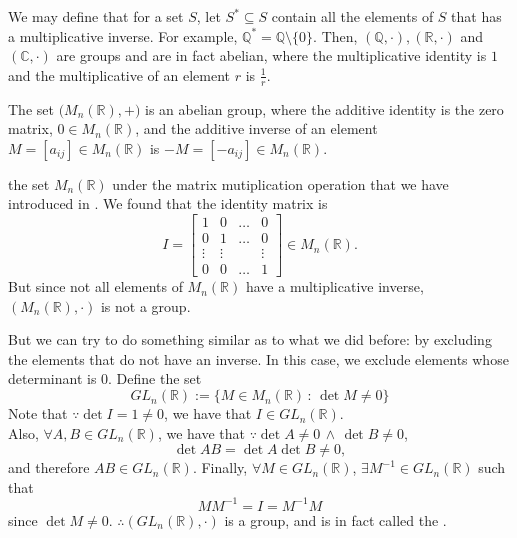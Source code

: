 \documentclass[notoc,notitlepage]{tufte-book}
\begin{document}
We may define that for a set $S$, let $S^* \subseteq S$ contain all the elements of $S$ that has a multiplicative inverse. For example, $\mathbb{Q}^* = \mathbb{Q} \setminus \{0\}$. Then, $(\mathbb{Q}, \cdot), (\mathbb{R}, \cdot)$ and $(\mathbb{C}, \cdot)$ are groups and are in fact abelian, where the multiplicative identity is $1$ and the multiplicative of an element $r$ is $\frac{1}{r}$.

\begin{eg}
  The set $\big( M_n(\mathbb{R}), + \big)$ is an abelian group, where the additive identity is the zero matrix, $0 \in M_n(\mathbb{R})$, and the additive inverse of an element $M = [a_{ij}] \in M_n(\mathbb{R})$ is $-M = [-a_{ij}] \in M_n(\mathbb{R})$.
\end{eg}

 the set $M_n(\mathbb{R})$ under the matrix mutiplication operation that we have introduced in . We found that the identity matrix is
\begin{equation*}
  I = \begin{bmatrix}
    1 & 0 & \hdots & 0 \\
    0 & 1 & \hdots & 0 \\
    \vdots & \vdots & & \vdots \\
    0 & 0 & \hdots & 1
  \end{bmatrix} \in M_n(\mathbb{R}).
\end{equation*}
But since not all elements of $M_n(\mathbb{R})$ have a multiplicative inverse, $(M_n(\mathbb{R}), \cdot)$ is not a group.

But we can try to do something similar as to what we did before: by excluding the elements that do not have an inverse. In this case, we exclude elements whose determinant is $0$. Define the set
\begin{equation*}
  GL_n(\mathbb{R}) := \{ M \in M_n(\mathbb{R}) \, : \, \det M \neq 0 \}
\end{equation*}
Note that $\because \det I = 1 \neq 0$, we have that $I \in GL_n(\mathbb{R})$. \\
Also, $\forall A, B \in GL_n(\mathbb{R} )$, we have that $\because \det A \neq 0 \, \land \, \det B \neq 0$,
\begin{equation*}
  \det AB = \det A \det B \neq 0,
\end{equation*}
and therefore $AB \in GL_n(\mathbb{R} )$. Finally, $\forall M \in GL_n(\mathbb{R})$, $\exists M^{-1} \in GL_n(\mathbb{R})$ such that
\begin{equation*}
  MM^{-1} = I = M^{-1} M
\end{equation*}
since $\det M \neq 0$. $\therefore (GL_n(\mathbb{R}), \cdot)$ is a group, and is in fact called the  .
\end{document}
